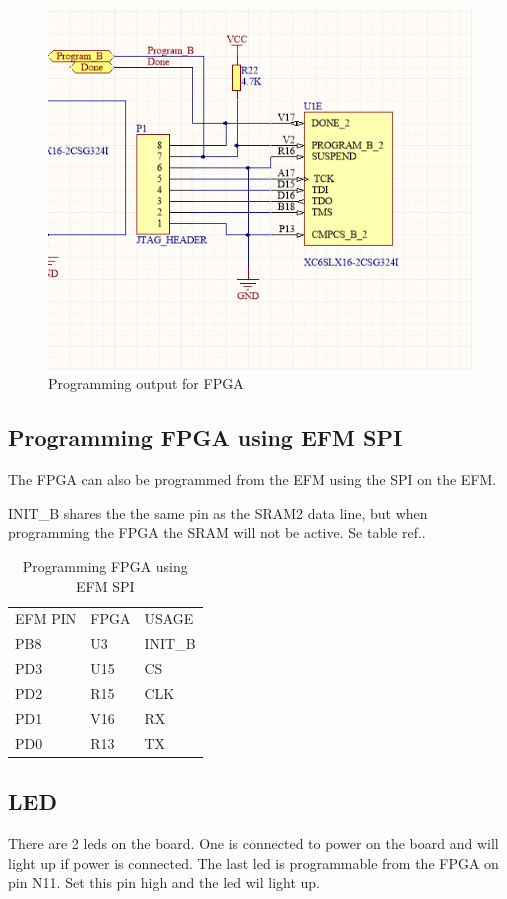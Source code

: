 \begin{figure}
    \includegraphics[width=\linewidth]{img/FPGA_Programmer.png}
    \caption{Programming output for FPGA}
    \label{fig:fpgaprogrammer}
\end{figure}

\subsection{Programming FPGA using EFM SPI}
The FPGA can also be programmed from the EFM using the SPI on the EFM. 

INIT\_B shares the the same pin as the SRAM2 data line, but when programming the FPGA the SRAM will not be active. Se table ref..

\begin{table}[]
\centering
\caption{Programming FPGA using EFM SPI}
\label{spiprogrammer}
\begin{tabular}{lll}
EFM PIN & FPGA & USAGE   \\
PB8     & U3   & INIT\_B \\
PD3     & U15  & CS      \\
PD2     & R15  & CLK     \\
PD1     & V16  & RX      \\
PD0     & R13  & TX     
\end{tabular}
\end{table}
\subsection{LED}
There are 2 leds on the board. One is connected to power on the board and will light up if power is connected. The last led is programmable from the FPGA on pin N11. Set this pin high and the led wil light up.
